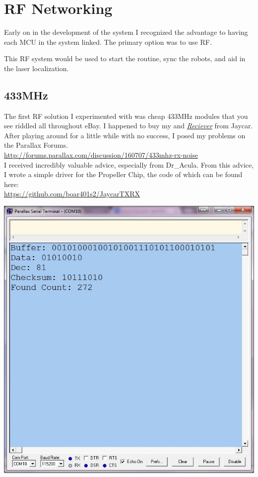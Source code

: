 		\chapter{RF Networking}
			Early on in the development of the system I recognized the advantage to having each MCU in the system linked. The primary option was to use RF.
			
			This RF system would be used to start the routine, sync the robots, and aid in the laser localization.
						
			\section{433MHz}	
				The first RF solution I experimented with was cheap 433MHz modules that you see riddled all throughout eBay. I happened to buy my \href{http://goo.gl/1zUzJe} and \href{http://goo.gl/pRp4Pb}{\textit{Reciever}} from Jaycar.\\
				
				After playing around for a little while with no success, I posed my problems on the Parallax Forums.\\
				
				\url{http://forums.parallax.com/discussion/160707/433mhz-rx-noise}\\
				
				I received incredibly valuable advice, especially from Dr\_Acula. From this advice, I wrote a simple driver for the Propeller Chip, the code of which can be found here:\\
				
				\url{https://github.com/boar401s2/JaycarTXRX}	
															
				\centerline{\includegraphics[width=0.75\linewidth]{images/433mhz}}
				

